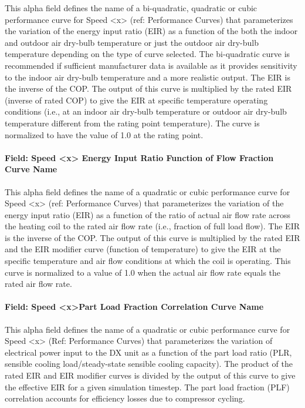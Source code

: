 This alpha field defines the name of a bi-quadratic, quadratic or cubic performance curve for Speed \textless{}x\textgreater{} (ref: Performance Curves) that parameterizes the variation of the energy input ratio (EIR) as a function of the both the indoor and outdoor air dry-bulb temperature or just the outdoor air dry-bulb temperature depending on the type of curve selected. The bi-quadratic curve is recommended if sufficient manufacturer data is available as it provides sensitivity to the indoor air dry-bulb temperature and a more realistic output. The EIR is the inverse of the COP. The output of this curve is multiplied by the rated EIR (inverse of rated COP) to give the EIR at specific temperature operating conditions (i.e., at an indoor air dry-bulb temperature or outdoor air dry-bulb temperature different from the rating point temperature). The curve is normalized to have the value of 1.0 at the rating point.

\paragraph{Field: Speed \textless{}x\textgreater{} Energy Input Ratio Function of Flow Fraction Curve Name}\label{field-speed-x-energy-input-ratio-function-of-flow-fraction-curve-name-1}

This alpha field defines the name of a quadratic or cubic performance curve for Speed \textless{}x\textgreater{} (ref: Performance Curves) that parameterizes the variation of the energy input ratio (EIR) as a function of the ratio of actual air flow rate across the heating coil to the rated air flow rate (i.e., fraction of full load flow). The EIR is the inverse of the COP. The output of this curve is multiplied by the rated EIR and the EIR modifier curve (function of temperature) to give the EIR at the specific temperature and air flow conditions at which the coil is operating. This curve is normalized to a value of 1.0 when the actual air flow rate equals the rated air flow rate.

\paragraph{Field: Speed \textless{}x\textgreater{}Part Load Fraction Correlation Curve Name}\label{field-speed-xpart-load-fraction-correlation-curve-name}

This alpha field defines the name of a quadratic or cubic performance curve for Speed \textless{}x\textgreater{} (Ref: Performance Curves) that parameterizes the variation of electrical power input to the DX unit as a function of the part load ratio (PLR, sensible cooling load/steady-state sensible cooling capacity). The product of the rated EIR and EIR modifier curves is divided by the output of this curve to give the effective EIR for a given simulation timestep. The part load fraction (PLF) correlation accounts for efficiency losses due to compressor cycling.


